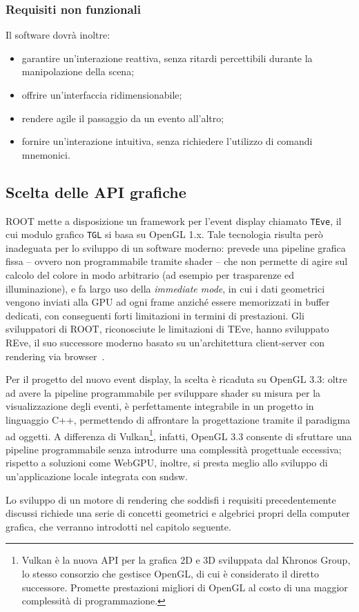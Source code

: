 \subsubsection{Requisiti non funzionali}
Il software dovrà inoltre:
\begin{itemize}
    \item garantire un’interazione reattiva, senza ritardi percettibili durante la manipolazione della scena;
    \item offrire un’interfaccia ridimensionabile;
    \item rendere agile il passaggio da un evento all’altro;
    \item fornire un’interazione intuitiva, senza richiedere l’utilizzo di comandi mnemonici.
\end{itemize}

\subsection{Scelta delle API grafiche}
ROOT mette a disposizione un framework per l'event display chiamato \texttt{TEve}, il cui modulo grafico \texttt{TGL} si basa su OpenGL 1.x.
Tale tecnologia risulta però inadeguata per lo sviluppo di un software moderno: prevede una pipeline grafica fissa -- ovvero non programmabile tramite shader -- che non permette di agire sul calcolo del colore in modo arbitrario (ad esempio per trasparenze ed illuminazione), e fa largo uso della \emph{immediate mode}, in cui i dati geometrici vengono inviati alla GPU ad ogni frame anziché essere memorizzati in buffer dedicati, con conseguenti forti limitazioni in termini di prestazioni.
Gli sviluppatori di ROOT, riconosciute le limitazioni di TEve, hanno sviluppato REve, il suo successore moderno basato su un'architettura client-server con rendering via browser~\cite{bohak_2024}.

Per il progetto del nuovo event display, la scelta è ricaduta su OpenGL 3.3: oltre ad avere la pipeline programmabile per sviluppare shader su misura per la visualizzazione degli eventi, è perfettamente integrabile in un progetto in linguaggio C++, permettendo di affrontare la progettazione tramite il paradigma ad oggetti.
A differenza di Vulkan\footnote{Vulkan è la nuova API per la grafica 2D e 3D sviluppata dal Khronos Group, lo stesso consorzio che gestisce OpenGL, di cui è considerato il diretto successore. Promette prestazioni migliori di OpenGL al costo di una maggior complessità di programmazione.}, infatti, OpenGL 3.3 consente di sfruttare una pipeline programmabile senza introdurre una complessità progettuale eccessiva; rispetto a soluzioni come WebGPU, inoltre, si presta meglio allo sviluppo di un’applicazione locale integrata con sndsw.

\bigskip
Lo sviluppo di un motore di rendering che soddisfi i requisiti precedentemente discussi richiede una serie di concetti geometrici e algebrici propri della computer grafica, che verranno introdotti nel capitolo seguente.